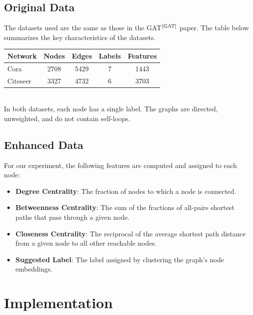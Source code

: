 \documentclass[12pt,conference]{ieeeconf} %
\begin{document}
\subsection{Original Data}
The datasets used are the same as those in the GAT$^\text{\cite{GAT}}$ paper. The table below summarizes the key characteristics of the datasets.
\begin{table}[h!] 
    \centering 
    \renewcommand{\arraystretch}{1.5} 
    \begin{tabular}{|l|c|c|c|c|} 
        \hline 
        \textbf{Network} & \textbf{Nodes} & \textbf{Edges} & \textbf{Labels} & \textbf{Features} \\
        \hline 
        Cora & 2708 & 5429 & 7 & 1443 \\
        Citeseer & 3327 & 4732 & 6 & 3703 \\
        \hline 
    \end{tabular} 
\end{table}
\\
In both datasets, each node has a single label. The graphs are directed, unweighted, and do not contain self-loops.

\subsection{Enhanced Data}
For our experiment, the following features are computed and assigned to each node:
\begin{itemize}
    \item \textbf{Degree Centrality}: The fraction of nodes to which a node is connected.
    \item \textbf{Betweenness Centrality}: The sum of the fractions of all-pairs shortest paths that pass through a given node.
    \item \textbf{Closeness Centrality}: The reciprocal of the average shortest path distance from a given node to all other reachable nodes.
    \item \textbf{Suggested Label}: The label assigned by clustering the graph's node embeddings.
\end{itemize}

\section{Implementation} 
\end{document}

